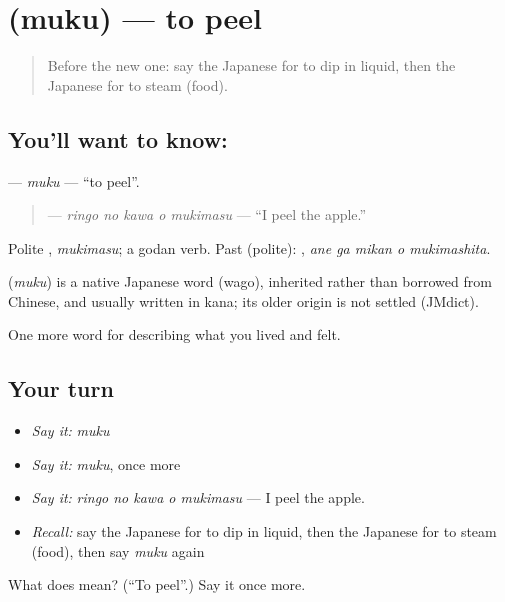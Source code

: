 \section[\texorpdfstring{\ja{むく} (muku)}{むく (muku)}]{ (muku) — to peel}

\label{lesson:JA-C492-muku}



\begin{quote}
Before the new one: say the Japanese for to dip in liquid, then the Japanese for to steam (food).
\end{quote}

\subsection*{You'll want to know: }
\textbf{} — \emph{muku} — \textquotedblleft{}to peel\textquotedblright{}.

\begin{quote}
\textbf{  } — \emph{ringo no kawa o mukimasu} — \textquotedblleft{}I peel the apple.\textquotedblright{}
\end{quote}

Polite \textbf{}, \emph{mukimasu}; a godan verb. Past (polite): \textbf{  }, \emph{ane ga mikan o mukimashita}.

\begin{cousinweb}
\textbf{} (\emph{muku}) is a native Japanese word (wago), inherited rather than borrowed from Chinese, and usually written in kana; its older origin is not settled (JMdict).
\end{cousinweb}

\begin{grammarlens}[title={What you've built}]
One more word for describing what you lived and felt.
\end{grammarlens}

\subsection*{Your turn}
\begin{itemize}
\raggedright
  \item \emph{Say it:} \emph{muku}
  \item \emph{Say it:} \emph{muku}, once more
  \item \emph{Say it:} \emph{ringo no kawa o mukimasu} — I peel the apple.
  \item \emph{Recall:} say the Japanese for to dip in liquid, then the Japanese for to steam (food), then say \emph{muku} again
\end{itemize}

\begin{tcolorbox}[breakable,colback=teal!4,colframe=teal!35!black,title={Before you move on}]
What does  mean? (\textquotedblleft{}To peel\textquotedblright{}.) Say it once more.
\end{tcolorbox}
